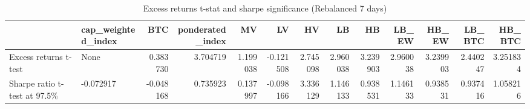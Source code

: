 \begin{table}
\centering
\caption{Excess returns t-stat and sharpe significance (Rebalanced 7 days)}
\label{signif100_7}
\begin{tabular}{llrrrrrrrrrrr}
\toprule
{} & cap\_weighted\_index &       BTC &  ponderated\_index &        MV &        LV &        HV &        LB &        HB &     LB\_EW &     HB\_EW &    LB\_BTC &    HB\_BTC \\
\midrule
Excess returns t-test        &               None &  0.383730 &          3.704719 &  1.199038 & -0.121508 &  2.745098 &  2.960038 &  3.239903 &  2.960038 &  3.239903 &  2.440247 &  3.251834 \\
Sharpe ratio t-test at 97.5\% &          -0.072917 & -0.048168 &          0.735923 &  0.137997 & -0.098166 &  3.336129 &  1.146133 &  0.938531 &  1.146133 &  0.938531 &  0.937416 &  1.058216 \\
\bottomrule
\end{tabular}
\end{table}
